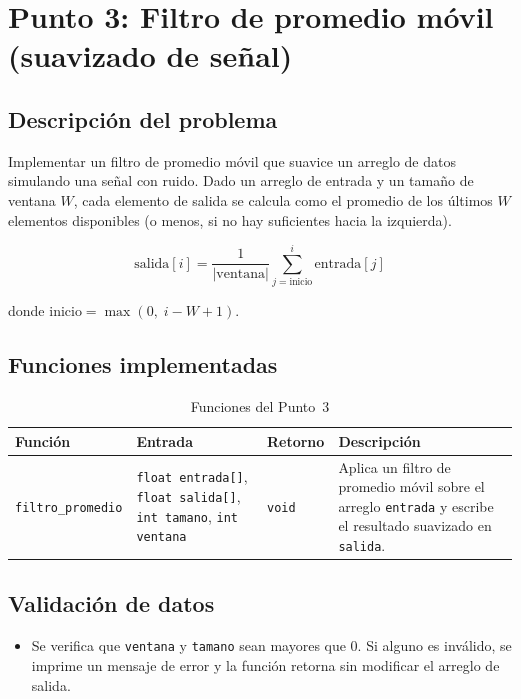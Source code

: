 \documentclass[12pt, letterpaper]{article}
\begin{document}
\section{Punto 3: Filtro de promedio móvil (suavizado de señal)}

\subsection{Descripción del problema}

Implementar un filtro de promedio móvil que suavice un arreglo de datos
simulando una señal con ruido. Dado un arreglo de entrada y un tamaño de
ventana $W$, cada elemento de salida se calcula como el promedio de los
últimos $W$ elementos disponibles (o menos, si no hay suficientes hacia
la izquierda).

\[
    \text{salida}[i] = \frac{1}{|\text{ventana}|} \sum_{j=\text{inicio}}^{i} \text{entrada}[j]
\]

donde $\text{inicio} = \max(0,\; i - W + 1)$.

\subsection{Funciones implementadas}

\begin{table}[H]
\centering
\begin{tabular}{|l|p{4.5cm}|l|p{4.5cm}|}
\hline
\textbf{Función} & \textbf{Entrada} & \textbf{Retorno} & \textbf{Descripción} \\
\hline
\texttt{filtro\_promedio} &
\texttt{float entrada[]},
\texttt{float salida[]},
\texttt{int tamano},
\texttt{int ventana} &
\texttt{void} &
Aplica un filtro de promedio móvil sobre el arreglo \texttt{entrada} y
escribe el resultado suavizado en \texttt{salida}. \\
\hline
\end{tabular}
\caption{Funciones del Punto~3}
\end{table}

\subsection{Validación de datos}

\begin{itemize}
    \item Se verifica que \texttt{ventana} y \texttt{tamano} sean mayores que 0.
          Si alguno es inválido, se imprime un mensaje de error y la función
          retorna sin modificar el arreglo de salida.
\end{itemize}
\end{document}
